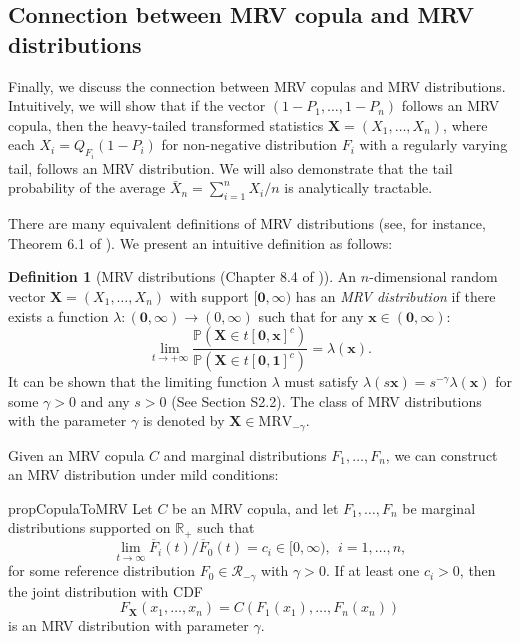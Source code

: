 \documentclass[12pt]{article}
\theoremstyle{plain}
\theoremstyle{plain}
\theoremstyle{definition}
\newtheorem{defn}{Definition}[section]
\renewcommand{\Pr}{\mathbb{P}}
\newcommand{\R}{\mathbb{R}}
\begin{document}
 
\subsection{Connection between MRV copula and MRV distributions}
\label{subsec:mrv-copula-and distribution}

Finally, we discuss the connection between MRV copulas and MRV distributions. 
Intuitively, we will show that if the vector $(1 - P_1, \dots, 1 - P_n)$ follows an MRV copula, then the heavy-tailed transformed statistics $\mathbf{X} = (X_1, \dots, X_n)$, where each $X_i = Q_{F_{i}}(1 - P_i)$ for non-negative distribution $F_i$ with a regularly varying tail, follows an MRV distribution. We will also demonstrate that the tail probability of the average $\bar X_n = \sum_{i=1}^n X_i/n$ is analytically tractable.

There are many equivalent definitions of MRV distributions (see, for instance, Theorem 6.1 of \cite{resnick2007heavy}). We present an intuitive definition as follows:
\begin{defn}[MRV distributions (Chapter 8.4 of \cite{beirlant2006statistics})]
\label{def:mrv}
An $n$-dimensional random vector $\mathbf{X}=(X_1,\dots,X_n)$ with support $[\mathbf{0},\bm{\infty})$ has 
an \emph{MRV distribution}
if there exists a function $\lambda:(\mathbf{0}, \bm{\infty}) \rightarrow (0,\infty)$ such that for any $\mathbf{x}\in(\mathbf{0}, \bm{\infty})$:
\begin{equation}
\label{eq:define-mrv}
\lim_{t\to+\infty}\frac{\Pr(\mathbf{X}\in t[\mathbf{0},\mathbf{x}]^c)}{\Pr(\mathbf{X}\in t[\mathbf{0},\mathbf{1}]^c)}=\lambda(\mathbf{x}).
\end{equation}
It can be shown that the limiting function $\lambda$ must satisfy $\lambda(s\mathbf{x})=s^{-\gamma}\lambda(\mathbf{x})$ for some $\gamma >0$ and any $s>0$ (See Section S2.2). 
The class of MRV distributions with the parameter $\gamma$ is denoted by $\mathbf{X}\in\mathrm{MRV}_{-\gamma}$.
\end{defn}
Given an MRV copula $C$ and marginal distributions $F_1, \dots, F_n$, we can construct an MRV distribution under mild conditions:
\begin{restatable}{prop}{CopulaToMRV}
\label{prop:copula-to-mrv-distribution}
Let $C$ be an MRV copula, and let $F_1, \dots, F_n$ be marginal distributions supported on $\R_+$ such that
\begin{equation}
\label{eq:define-ci}
\lim_{t\to\infty}\overline{F}_i(t)/\overline{F}_0(t)=c_i\in [0,\infty),~~i=1,\dots,n,
\end{equation}
for some reference distribution $F_0\in\mathscr{R}_{-\gamma}$ with $\gamma>0$. If at least one $c_i > 0$, then the joint distribution with CDF
 \begin{equation*} 
 \label{eq:MRV-250218-1}
 F_{\mathbf{X}}(x_1,\dots,x_n) = C\left(F_1(x_1), \dots,F_n(x_n)\right)
\end{equation*} 
is an MRV distribution with parameter $\gamma$.
\end{restatable}
\end{document}
